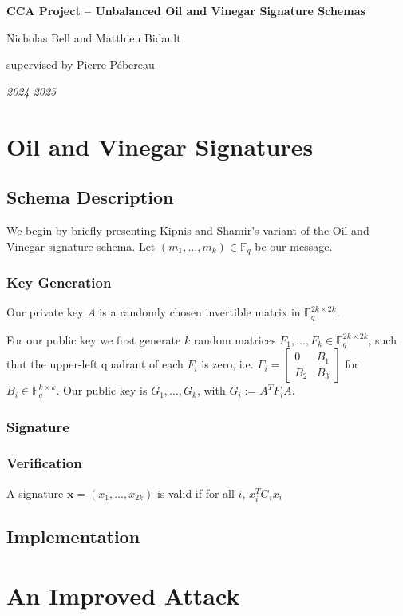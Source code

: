 \documentclass[12pt, a4paper]{article}
\begin{document}
	
	
	\begin{titlepage}
		\centering
		{\Huge\textbf{CCA Project -- Unbalanced Oil and Vinegar Signature Schemas}\par}
		\vspace{0.5cm}
		{\Large Nicholas Bell and Matthieu Bidault\par}
		\vspace{0.5cm}
		{\Large supervised by Pierre Pébereau\par}
		\vfill
		\textit{2024-2025}
		\vspace*{\fill}
	\end{titlepage}
	
	\setcounter{tocdepth}{3}
	\tableofcontents
	\thispagestyle{fancy}
	\newpage
	
	\section{Oil and Vinegar Signatures}
	
	\subsection{Schema Description}
	
	We begin by briefly presenting Kipnis and Shamir's variant of the Oil and Vinegar signature schema. Let $(m_1,\dots,m_k) \in \mathbb{F}_q$ be our message.
	
	\subsubsection{Key Generation}
	
	Our private key $A$ is a randomly chosen invertible matrix in $\mathbb{F}_q^{2k\times2k}$.
	
	For our public key we first generate $k$ random matrices $F_1,\dots,F_k \in \mathbb{F}_q^{2k\times2k}$, such that the upper-left quadrant of each $F_i$ is zero, i.e. $F_i = \begin{bmatrix}
	0 & B_1\\
	B_2 & B_3
	\end{bmatrix}$ for $B_i \in \mathbb{F}_q^{k\times k}$. Our public key is $G_1,\dots,G_k$, with $G_i := A^TF_iA$.
	
	\subsubsection{Signature}
	
	
	
	\subsubsection{Verification}
	
	A signature $\mathbf{x} = (x_1,\dots,x_{2k})$ is valid if for all $i$, $x_i^TG_ix_i$
	
	\subsection{Implementation}
	
	
	
	\section{An Improved Attack}
	
	\subsection{}
		
\end{document}

